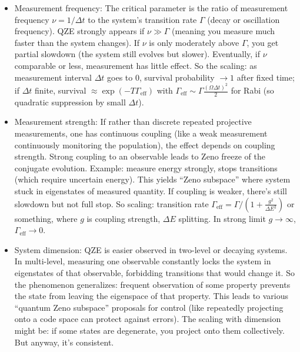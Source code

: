 \documentclass[11pt]{article}
\begin{document}
\begin{itemize}

\item 
Measurement frequency: The critical parameter is the ratio of measurement frequency $\nu = 1/\Delta t$ to the system’s transition rate $\Gamma$ (decay or oscillation frequency). QZE strongly appears if $\nu \gg \Gamma$ (meaning you measure much faster than the system changes). If $\nu$ is only moderately above $\Gamma$, you get partial slowdown (the system still evolves but slower). Eventually, if $\nu$ comparable or less, measurement has little effect. So the scaling: as measurement interval $\Delta t$ goes to 0, survival probability $\to 1$ after fixed time; if $\Delta t$ finite, survival $\approx \exp(-T\Gamma_{\text{eff}})$ with $\Gamma_{\text{eff}} \sim \Gamma \frac{(\Omega \Delta t)^2}{2}$ for Rabi (so quadratic suppression by small $\Delta t$).




\item 
Measurement strength: If rather than discrete repeated projective measurements, one has continuous coupling (like a weak measurement continuously monitoring the population), the effect depends on coupling strength. Strong coupling to an observable leads to Zeno freeze of the conjugate evolution. Example: measure energy strongly, stops transitions (which require uncertain energy). This yields “Zeno subspace” where system stuck in eigenstates of measured quantity. If coupling is weaker, there’s still slowdown but not full stop. So scaling: transition rate $\Gamma_{\text{eff}} = \Gamma / (1 + \frac{g^2}{\Delta E^2})$ or something, where $g$ is coupling strength, $\Delta E$ splitting. In strong limit $g\to\infty$, $\Gamma_{\text{eff}} \to 0$.




\item 
System dimension: QZE is easier observed in two-level or decaying systems. In multi-level, measuring one observable constantly locks the system in eigenstates of that observable, forbidding transitions that would change it. So the phenomenon generalizes: frequent observation of some property prevents the state from leaving the eigenspace of that property. This leads to various “quantum Zeno subspace” proposals for control (like repeatedly projecting onto a code space can protect against errors). The scaling with dimension might be: if some states are degenerate, you project onto them collectively. But anyway, it’s consistent.





\end{itemize}
\end{document}
